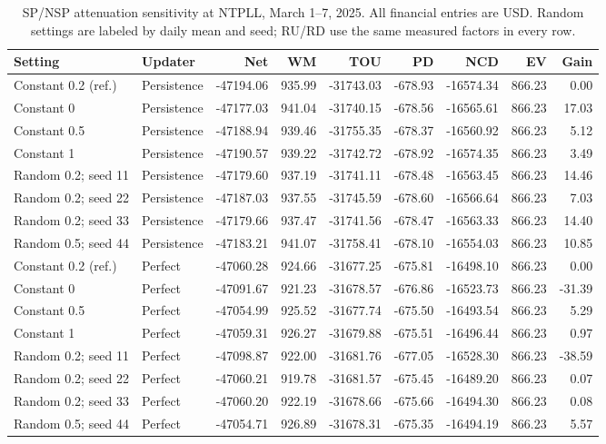 \documentclass[final,5p,times]{elsarticle}
\begin{document}
\begin{table}[p]
\centering
\caption{SP/NSP attenuation sensitivity at NTPLL, March 1--7, 2025. All financial entries are USD. Random settings are labeled by daily mean and seed; RU/RD use the same measured factors in every row.}
\label{tab:weekly_factors}
\footnotesize
\setlength{\tabcolsep}{3pt}
\begin{tabular}{llrrrrrrr}
\toprule
Setting & Updater & Net & WM & TOU & PD & NCD & EV & Gain \\
\midrule
Constant 0.2 (ref.) & Persistence & -47194.06 & 935.99 & -31743.03 & -678.93 & -16574.34 & 866.23 & 0.00 \\
Constant 0 & Persistence & -47177.03 & 941.04 & -31740.15 & -678.56 & -16565.61 & 866.23 & 17.03 \\
Constant 0.5 & Persistence & -47188.94 & 939.46 & -31755.35 & -678.37 & -16560.92 & 866.23 & 5.12 \\
Constant 1 & Persistence & -47190.57 & 939.22 & -31742.72 & -678.92 & -16574.35 & 866.23 & 3.49 \\
Random 0.2; seed 11 & Persistence & -47179.60 & 937.19 & -31741.11 & -678.48 & -16563.45 & 866.23 & 14.46 \\
Random 0.2; seed 22 & Persistence & -47187.03 & 937.55 & -31745.59 & -678.60 & -16566.64 & 866.23 & 7.03 \\
Random 0.2; seed 33 & Persistence & -47179.66 & 937.47 & -31741.56 & -678.47 & -16563.33 & 866.23 & 14.40 \\
Random 0.5; seed 44 & Persistence & -47183.21 & 941.07 & -31758.41 & -678.10 & -16554.03 & 866.23 & 10.85 \\
\midrule
Constant 0.2 (ref.) & Perfect & -47060.28 & 924.66 & -31677.25 & -675.81 & -16498.10 & 866.23 & 0.00 \\
Constant 0 & Perfect & -47091.67 & 921.23 & -31678.57 & -676.86 & -16523.73 & 866.23 & -31.39 \\
Constant 0.5 & Perfect & -47054.99 & 925.52 & -31677.74 & -675.50 & -16493.54 & 866.23 & 5.29 \\
Constant 1 & Perfect & -47059.31 & 926.27 & -31679.88 & -675.51 & -16496.44 & 866.23 & 0.97 \\
Random 0.2; seed 11 & Perfect & -47098.87 & 922.00 & -31681.76 & -677.05 & -16528.30 & 866.23 & -38.59 \\
Random 0.2; seed 22 & Perfect & -47060.21 & 919.78 & -31681.57 & -675.45 & -16489.20 & 866.23 & 0.07 \\
Random 0.2; seed 33 & Perfect & -47060.20 & 922.19 & -31678.66 & -675.66 & -16494.30 & 866.23 & 0.08 \\
Random 0.5; seed 44 & Perfect & -47054.71 & 926.89 & -31678.31 & -675.35 & -16494.19 & 866.23 & 5.57 \\
\bottomrule
\end{tabular}
\end{table}
\end{document}
